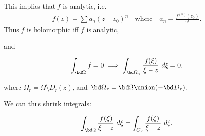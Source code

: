 This implies that \(f\) is analytic, i.e.~
\begin{align*}
f(z) = \sum a_n (z-z_0)^n \quad\text{where}\quad a_n = \frac{f^{(n)}(z_0) }{n!}
.\end{align*} Thus \(f\) is holomorphic iff \(f\) is analytic,

and

\begin{align*}
\int_{\bd \Omega} f = 0 \implies \int_{\bd \Omega_\gamma} \frac{f(\xi)}{\xi - z}~d\xi = 0
.\end{align*}

where \(\Omega_r = \Omega\setminus D_r(z)\), and
\(\bd \Omega_r = \bd \Omega \union (-\bd D_r)\).

We can thus shrink integrals:

\begin{align*}
\int_{\bd \Omega} \frac{f(\xi)} {\xi - z} ~d\xi = \int_{C_r} \frac{f(\xi)} {\xi - z} ~d\xi
.\end{align*}


